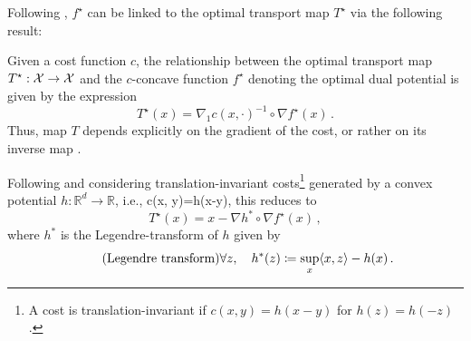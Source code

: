 Following \citet{gangbo1996geometry}, $f^\star$ can be linked to the optimal transport map $T^\star$ via the following result:
\begin{theorem} \label{thm:gangbo-mccann}
	Given a cost function $c$, the relationship between the optimal transport map $T^\star : {\mathcal{X}} \rightarrow {\mathcal{X}}$ and the $c$-concave function $f^\star$ denoting the optimal dual potential is given by the expression 
	\begin{equation}
		T^{\star}(x)=\nabla_1 c(x, \cdot)^{-1} \circ \nabla f^{\star}(x)\,.
	\end{equation}
	Thus, map $T$ depends explicitly on the gradient of the cost, or rather on its inverse map \citep{gangbo1995optimal}. 
	
	Following \citet{gangbo1996geometry} and considering translation-invariant costs\footnote{A cost is translation-invariant if $c(x,y) = h(x-y)$ for $h(z) = h(-z)$.} generated by a convex potential $h: \mathbb{R}^d \rightarrow \mathbb{R}$, i.e., c(x, y)=h(x-y), this reduces to
	\begin{equation} \label{eq:gangbo_h}
		T^{\star}(x)=x-\nabla h^* \circ \nabla f^{\star}(x)\,,
	\end{equation}
	where $h^*$ is the Legendre-transform of $h$ given by
	\begin{equation} \label{eq:legendre}
		\tag{Legendre transform}
		\forall z, \quad h^*(z) \coloneqq \sup _x \langle x, z\rangle-h(x)\,.
	\end{equation}

\end{theorem}
